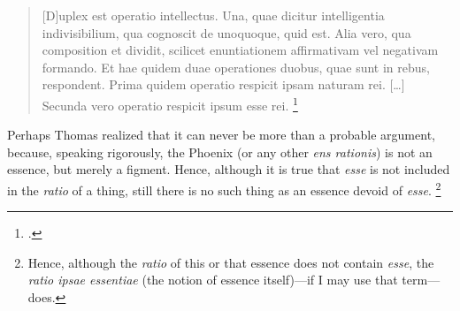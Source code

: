 \begin{quotation}
[D]uplex est operatio intellectus. Una, quae dicitur intelligentia indivisibilium, qua cognoscit de unoquoque, quid est. Alia vero, qua composition et dividit, scilicet enuntiationem affirmativam vel negativam formando. Et hae quidem duae operationes duobus, quae sunt in rebus, respondent. Prima quidem operatio respicit ipsam naturam rei. [\ldots]  Secunda vero operatio respicit ipsum esse rei.%
%
\footnote{\Cite[pars~3, q.~5 a.~3 co.]{st:detrinitate}.}
\end{quotation}
%
Perhaps Thomas realized that it can never be more than a probable argument, because, speaking rigorously, the Phoenix (or any other \emph{ens rationis}) is not an essence, but merely a figment. Hence, although it is true that \emph{esse} is not included in the \emph{ratio} of a thing, still there is no such thing as an essence devoid of \emph{esse}.%
%
\footnote{Hence, although the \emph{ratio} of this or that essence does not contain \emph{esse}, the \emph{ratio ipsae essentiae} (the notion of essence itself)---if I may use that term---does.}


